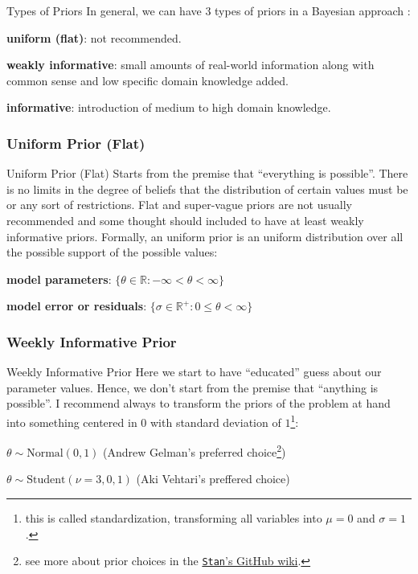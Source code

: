 \begin{frame}{Types of Priors}
	In general, we can have 3 types of priors in a Bayesian approach
	\parencite{gelman2013bayesian, mcelreath2020statistical, vandeschootBayesianStatisticsModelling2021}:
	\begin{vfilleditems}
		\item \textbf{uniform (flat)}: not recommended.
		\item \textbf{weakly informative}: small amounts of real-world information
		along with common sense and low specific domain knowledge added.
		\item \textbf{informative}: introduction of medium to high domain knowledge.
	\end{vfilleditems}
\end{frame}

\subsubsection{Uniform Prior (Flat)}
\begin{frame}{Uniform Prior (Flat)}
	Starts from the premise that ``everything is possible''.
	There is no limits in the degree of beliefs that the distribution of certain
	values must be or any sort of restrictions.
	\vfill
	Flat and super-vague priors are not usually recommended and some thought
	should included to have at least weakly informative priors.
	\vfill
	Formally, an uniform prior is an uniform distribution over all the
	possible support of the possible values:
	\begin{vfilleditems}
		\item \textbf{model parameters}: $\{\theta \in \mathbb{R} : -\infty < \theta < \infty\}$
		\item \textbf{model error or residuals}: $\{\sigma \in \mathbb{R}^+ : 0 \leq \theta < \infty\}$
	\end{vfilleditems}
\end{frame}

\subsubsection{Weekly Informative Prior}
\begin{frame}{Weekly Informative Prior}
	Here we start to have ``educated'' guess about our parameter values.
	Hence, we don't start from the premise that ``anything is possible''.
	\vfill
	I recommend always to transform the priors of the problem at hand into
	something centered in $0$ with standard deviation of $1$\footnote{
		this is called standardization,
		transforming all variables into $\mu=0$ and $\sigma=1$.}:
	\vfill
	\begin{vfilleditems}
		\item $\theta \sim \text{Normal}(0, 1)$ (Andrew Gelman's preferred choice\footnote{
			see more about prior choices in the
			\href{https://github.com/stan-dev/stan/wiki/Prior-Choice-Recommendations}{\texttt{Stan}'s GitHub wiki}.})
		\item $\theta \sim \text{Student}(\nu=3, 0, 1)$ (Aki Vehtari's preffered choice)
	\end{vfilleditems}
\end{frame}

